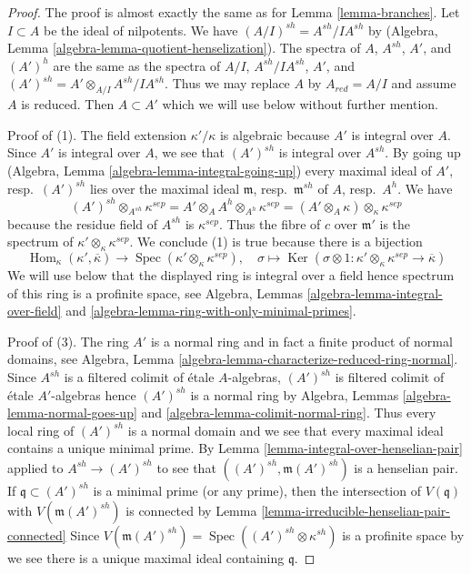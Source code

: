 \documentclass[10pt,a4paper]{amsart}
\theoremstyle{plain}
\theoremstyle{definition}
\theoremstyle{remark}
\numberwithin{equation}{subsection}
\def\Spec{\mathop{\mathrm{Spec}}}
\def\Hom{\mathop{\mathrm{Hom}}\nolimits}
\def\Ker{\mathop{\mathrm{Ker}}}
\begin{document}
\begin{proof}
The proof is almost exactly the same as for Lemma \ref{lemma-branches}.
Let $I \subset A$ be the ideal of nilpotents.
We have $(A/I)^{sh} = A^{sh}/IA^{sh}$ by
(Algebra, Lemma \ref{algebra-lemma-quotient-henselization}).
The spectra of $A$, $A^{sh}$, $A'$, and $(A')^h$ are the same
as the spectra of $A/I$, $A^{sh}/IA^{sh}$, $A'$, and
$(A')^{sh} = A' \otimes_{A/I} A^{sh}/IA^{sh}$. Thus
we may replace $A$ by $A_{red} = A/I$ and assume $A$ is reduced.
Then $A \subset A'$ which we will use below without further mention.

\medskip\noindent
Proof of (1). The field extension $\kappa'/\kappa$ is algebraic
because $A'$ is integral over $A$. Since $A'$ is integral over $A$,
we see that $(A')^{sh}$ is integral over $A^{sh}$. By going up
(Algebra, Lemma \ref{algebra-lemma-integral-going-up})
every maximal ideal of $A'$, resp.\ $(A')^{sh}$ lies over
the maximal ideal $\mathfrak m$, resp.\ $\mathfrak m^{sh}$ of
$A$, resp.\ $A^h$. We have
$$
(A')^{sh} \otimes_{A^{sh}} \kappa^{sep} =
A' \otimes_A A^h \otimes_{A^h} \kappa^{sep} =
(A' \otimes_A \kappa) \otimes_{\kappa} \kappa^{sep}
$$
because the residue field of $A^{sh}$ is $\kappa^{sep}$.
Thus the fibre of $c$ over $\mathfrak m'$ is the spectrum
of $\kappa' \otimes_\kappa \kappa^{sep}$.
We conclude (1) is true because there is a bijection
$$
\Hom_\kappa(\kappa', \overline{\kappa}) \to
\Spec(\kappa' \otimes_\kappa \kappa^{sep}),\quad
\sigma \mapsto \Ker(
\sigma \otimes 1 : \kappa' \otimes_\kappa \kappa^{sep} \to \overline{\kappa}
)
$$
We will use below that the displayed ring is integral over a field
hence spectrum of this ring is a profinite space, see
Algebra, Lemmas \ref{algebra-lemma-integral-over-field} and
\ref{algebra-lemma-ring-with-only-minimal-primes}.

\medskip\noindent
Proof of (3). The ring $A'$ is a normal ring and in fact a
finite product of normal domains, see
Algebra, Lemma \ref{algebra-lemma-characterize-reduced-ring-normal}.
Since $A^{sh}$ is a filtered colimit of \'etale $A$-algebras,
$(A')^{sh}$ is filtered colimit of \'etale $A'$-algebras
hence $(A')^{sh}$ is a normal ring by
Algebra, Lemmas \ref{algebra-lemma-normal-goes-up} and
\ref{algebra-lemma-colimit-normal-ring}.
Thus every local ring of $(A')^{sh}$ is a normal domain
and we see that every maximal ideal contains a unique minimal prime.
By Lemma \ref{lemma-integral-over-henselian-pair} applied
to $A^{sh} \to (A')^{sh}$ to see that $((A')^{sh}, \mathfrak m(A')^{sh})$
is a henselian pair. If $\mathfrak q \subset (A')^{sh}$
is a minimal prime (or any prime), then the intersection of
$V(\mathfrak q)$ with $V(\mathfrak m (A')^{sh})$ is connected
by Lemma \ref{lemma-irreducible-henselian-pair-connected}
Since $V(\mathfrak m (A')^{sh}) = \Spec((A')^{sh} \otimes \kappa^{sh})$
is a profinite space by we see there is a unique
maximal ideal containing $\mathfrak q$.


\end{proof}
\end{document}
